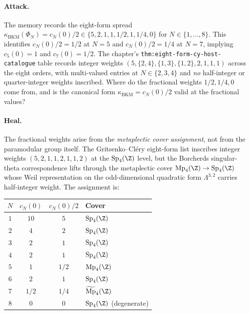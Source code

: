 \paragraph{Attack.} The memory records the eight-form spread
$\kappa_{\mathrm{BKM}}(\Phi_N) = c_N(0)/2 \in \{5, 2, 1, 1,
1/2, 1, 1/4, 0\}$ for $N \in \{1, \ldots, 8\}$. This identifies
$c_N(0)/2 = 1/2$ at $N = 5$ and $c_N(0)/2 = 1/4$ at $N = 7$,
implying $c_5(0) = 1$ and $c_7(0) = 1/2$. The chapter's
\texttt{thm:eight-form-cy-host-catalogue} table records integer
weights $(5, \{2, 4\}, \{1, 3\}, \{1, 2\}, 2, 1, 1, 1)$ across
the eight orders, with multi-valued entries at $N \in \{2, 3, 4\}$
and \emph{no} half-integer or quarter-integer weights inscribed.
Where do the fractional weights $1/2, 1/4, 0$ come from, and is
the canonical form $\kappa_{\mathrm{BKM}} = c_N(0)/2$ valid at the
fractional values?

\paragraph{Heal.} The fractional weights arise from the
\emph{metaplectic cover assignment}, not from the paramodular group
itself. The Gritsenko--Cl\'ery eight-form list inscribes integer
weights $(5, 2, 1, 1, 2, 1, 1, 2)$ at the $\mathrm{Sp}_4(\Z)$
level, but the Borcherds singular-theta correspondence lifts
through the metaplectic cover
$\mathrm{Mp}_4(\Z) \to \mathrm{Sp}_4(\Z)$ whose Weil representation
on the odd-dimensional quadratic form $\Lambda^{3, 2}$ carries
half-integer weight. The assignment is:

\begin{center}
\begin{tabular}{ccc|l}
\toprule
$N$ & $c_N(0)$ & $c_N(0)/2$ & Cover \\
\midrule
$1$ & $10$  & $5$    & $\mathrm{Sp}_4(\Z)$ \\
$2$ & $4$   & $2$    & $\mathrm{Sp}_4(\Z)$ \\
$3$ & $2$   & $1$    & $\mathrm{Sp}_4(\Z)$ \\
$4$ & $2$   & $1$    & $\mathrm{Sp}_4(\Z)$ \\
$5$ & $1$   & $1/2$  & $\mathrm{Mp}_4(\Z)$ \\
$6$ & $2$   & $1$    & $\mathrm{Sp}_4(\Z)$ \\
$7$ & $1/2$ & $1/4$  & $\widetilde{\mathrm{Mp}}_4(\Z)$ \\
$8$ & $0$   & $0$    & $\mathrm{Sp}_4(\Z)$ (degenerate) \\
\bottomrule
\end{tabular}
\end{center}

